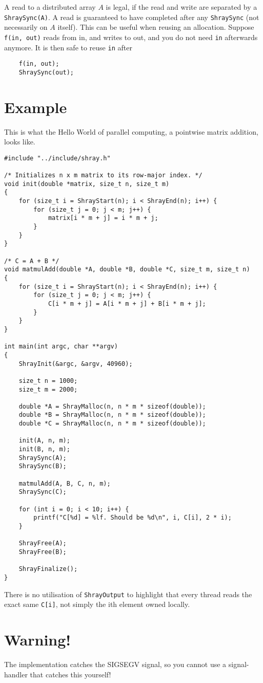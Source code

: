 \documentclass{article}
\begin{document}
A read to a distributed array $A$ is legal, if the read and write are separated by a 
\texttt{ShraySync(A)}. A read is guaranteed to have completed after any \texttt{ShraySync}
(not necessarily on $A$ itself). This can be useful when reusing an allocation. 
Suppose \texttt{f(in, out)} reads from in, and writes to out,
and you do not need \texttt{in} afterwards anymore. It is then safe to reuse \texttt{in} after

\begin{lstlisting}
    f(in, out);
    ShraySync(out);
\end{lstlisting}

\section{Example}

This is what the Hello World of parallel computing, a pointwise matrix addition, looks like.

\begin{lstlisting}
#include "../include/shray.h"

/* Initializes n x m matrix to its row-major index. */
void init(double *matrix, size_t n, size_t m)
{
    for (size_t i = ShrayStart(n); i < ShrayEnd(n); i++) {
        for (size_t j = 0; j < m; j++) {
            matrix[i * m + j] = i * m + j;
        }
    }
}

/* C = A + B */
void matmulAdd(double *A, double *B, double *C, size_t m, size_t n)
{    
    for (size_t i = ShrayStart(n); i < ShrayEnd(n); i++) {
        for (size_t j = 0; j < m; j++) {
            C[i * m + j] = A[i * m + j] + B[i * m + j];
        }
    }
}

int main(int argc, char **argv)
{
    ShrayInit(&argc, &argv, 40960);

    size_t n = 1000;
    size_t m = 2000;

    double *A = ShrayMalloc(n, n * m * sizeof(double));
    double *B = ShrayMalloc(n, n * m * sizeof(double));
    double *C = ShrayMalloc(n, n * m * sizeof(double));

    init(A, n, m);
    init(B, n, m);
    ShraySync(A);
    ShraySync(B);

    matmulAdd(A, B, C, n, m);
    ShraySync(C);

    for (int i = 0; i < 10; i++) {
        printf("C[%d] = %lf. Should be %d\n", i, C[i], 2 * i);
    }

    ShrayFree(A);
    ShrayFree(B);

    ShrayFinalize();
}
\end{lstlisting}

There is no utilisation of \texttt{ShrayOutput} to highlight that every thread reads the
exact same \texttt{C[i]}, not simply the ith element owned locally. 

\section{Warning!}

The implementation catches the SIGSEGV signal, so you cannot use a signal-handler that 
catches this yourself!
\end{document}
